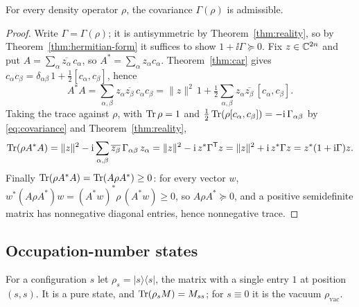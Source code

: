 \begin{theorem}[Admissibility]\label{thm:admissible}
For every density operator $\rho$, the covariance $\Gamma(\rho)$ is admissible.
\end{theorem}
\begin{proof}
Write $\Gamma=\Gamma(\rho)$; it is antisymmetric by Theorem~\ref{thm:reality}, so by
Theorem~\ref{thm:hermitian-form} it suffices to show $1+\ii\Gamma\succeq0$. Fix
$z\in\mathbb C^{2n}$ and put $A=\sum_\alpha\overline{z_\alpha}\,c_\alpha$, so
$A^*=\sum_\alpha z_\alpha c_\alpha$. Theorem~\ref{thm:car} gives
$c_\alpha c_\beta=\delta_{\alpha\beta}\,1+\tfrac12[c_\alpha,c_\beta]$, hence
\[
 A^*A=\sum_{\alpha,\beta}z_\alpha\overline{z_\beta}\,c_\alpha c_\beta
 =\|z\|^2\,1+\tfrac12\sum_{\alpha,\beta}z_\alpha\overline{z_\beta}\,[c_\alpha,c_\beta] .
\]
Taking the trace against $\rho$, with $\operatorname{Tr}\rho=1$ and
$\tfrac12\operatorname{Tr}(\rho[c_\alpha,c_\beta])=-\mathrm i\,\Gamma_{\alpha\beta}$ by
\eqref{eq:covariance} and Theorem~\ref{thm:reality},
\[
 \operatorname{Tr}(\rho A^*A)=\|z\|^2-\mathrm i\sum_{\alpha,\beta}\overline{z_\beta}\,\Gamma_{\alpha\beta}\,z_\alpha
 =\|z\|^2-\mathrm i\,z^*\Gamma^{\mathsf T}z=\|z\|^2+\mathrm i\,z^*\Gamma z=z^*(1+\mathrm i\Gamma)z .
\]
Finally $\operatorname{Tr}(\rho A^*A)=\operatorname{Tr}(A\rho A^*)\geq0$: for every vector $w$,
$w^*(A\rho A^*)w=(A^*w)^*\rho\,(A^*w)\geq0$, so $A\rho A^*\succeq0$, and a positive
semidefinite matrix has nonnegative diagonal entries, hence nonnegative trace.
\end{proof}

\subsection{Occupation-number states}
For a configuration $s$ let $\rho_s=|s\rangle\langle s|$, the matrix with a single
entry $1$ at position $(s,s)$. It is a pure state, and $\operatorname{Tr}(\rho_sM)=M_{ss}$; for $s\equiv0$
it is the vacuum $\rho_{\mathrm{vac}}$.

